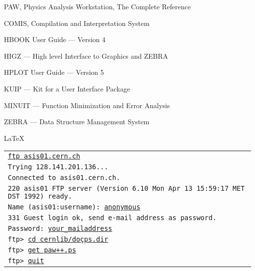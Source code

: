 {\samepage \clearpage \begin{UL}\item PAW, Physics Analysis Workstation, The Complete Reference~\cite{bib-PAW}
\item COMIS, Compilation and Interpretation System~\cite{bib-COMIS}
\item HBOOK User Guide --- Version 4~\cite{bib-HBOOK}
\item HIGZ --- High level Interface to Graphics and ZEBRA~\cite{bib-HIGZ}
\item HPLOT User Guide --- Version 5~\cite{bib-HPLOT}
\item KUIP --- Kit for a User Interface Package~\cite{bib-KUIP}
\item MINUIT --- Function Minimization and Error Analysis~\cite{bib-MINUIT}
\item ZEBRA --- Data Structure Management System~\cite{bib-ZEBRA}
\end{UL}
}


\newpage

{\samepage \clearpage \LaTeX
}


\newpage

{\samepage \clearpage \begin{tabular}{@{\hspace{5mm}}>{\tt}l}
\underline{ftp asis01.cern.ch}\\  
Trying 128.141.201.136...\\  
Connected to asis01.cern.ch.\\  
220 asis01 FTP server (Version 6.10 Mon Apr 13 15:59:17 MET DST 1992) ready.\\  
Name (asis01:username): \underline{anonymous}\\  
331 Guest login ok, send e-mail address as password.\\  
Password: \underline{your\_{}mailaddress}\\  
ftp> \underline{cd cernlib/do\c cps.dir}\\  
ftp> \underline{get paw++.ps}\\  
ftp> \underline{quit}\\  
\end{tabular}
}


\newpage

